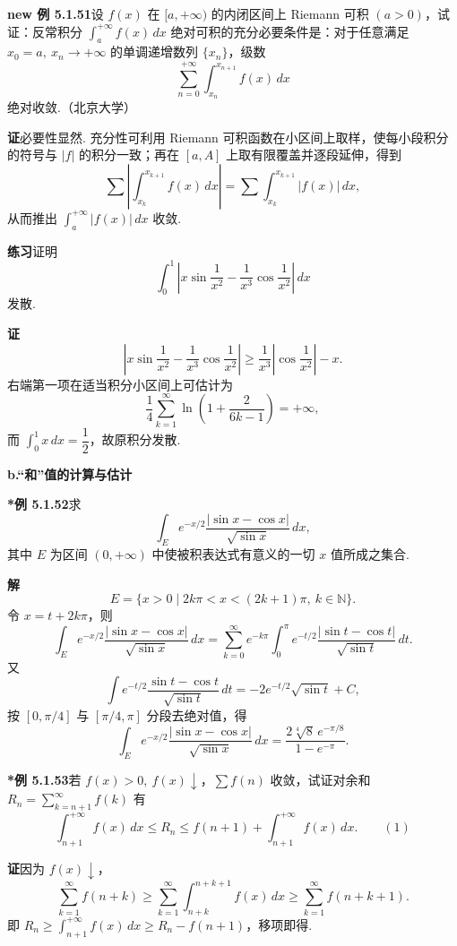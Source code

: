 \documentclass[UTF8, 12pt, fontset=fandol, oneside]{ctexart}
\begin{document}
\noindent\textbf{new 例 5.1.51}\quad 设 $f(x)$ 在 $[a,+\infty)$ 的内闭区间上 Riemann 可积 $(a>0)$，试证：反常积分 $\displaystyle\int_a^{+\infty}f(x)\,dx$ 绝对可积的充分必要条件是：对于任意满足 $x_0=a,\ x_n\to+\infty$ 的单调递增数列 $\{x_n\}$，级数
\[
  \sum_{n=0}^{+\infty}\int_{x_n}^{x_{n+1}}f(x)\,dx
\]
绝对收敛.（北京大学）

\noindent\textbf{证}\quad 必要性显然. 充分性可利用 Riemann 可积函数在小区间上取样，使每小段积分的符号与 $|f|$ 的积分一致；再在 $[a,A]$ 上取有限覆盖并逐段延伸，得到
\[
  \sum\left|\int_{x_k}^{x_{k+1}}f(x)\,dx\right|
  =\sum\int_{x_k}^{x_{k+1}}|f(x)|\,dx,
\]
从而推出 $\displaystyle\int_a^{+\infty}|f(x)|\,dx$ 收敛.

\noindent\textbf{练习}\quad 证明
\[
  \int_0^1\left|x\sin\frac1{x^2}-\frac1{x^3}\cos\frac1{x^2}\right|\,dx
\]
发散.

\noindent\textbf{证}\quad
\[
  \left|x\sin\frac1{x^2}-\frac1{x^3}\cos\frac1{x^2}\right|
  \ge\frac1{x^3}\left|\cos\frac1{x^2}\right|-x.
\]
右端第一项在适当积分小区间上可估计为
\[
  \frac14\sum_{k=1}^{\infty}\ln\left(1+\frac2{6k-1}\right)=+\infty,
\]
而 $\int_0^1x\,dx=\dfrac12$，故原积分发散.

\noindent\textbf{b.\quad “和”值的计算与估计}

\noindent\textbf{*例 5.1.52}\quad 求
\[
  \int_E e^{-x/2}\frac{|\sin x-\cos x|}{\sqrt{\sin x}}\,dx,
\]
其中 $E$ 为区间 $(0,+\infty)$ 中使被积表达式有意义的一切 $x$ 值所成之集合.

\noindent\textbf{解}\quad
\[
  E=\{x>0\mid 2k\pi<x<(2k+1)\pi,\ k\in\mathbb N\}.
\]
令 $x=t+2k\pi$，则
\[
  \int_E e^{-x/2}\frac{|\sin x-\cos x|}{\sqrt{\sin x}}\,dx
  =\sum_{k=0}^{\infty}e^{-k\pi}\int_0^\pi
  e^{-t/2}\frac{|\sin t-\cos t|}{\sqrt{\sin t}}\,dt.
\]
又
\[
  \int e^{-t/2}\frac{\sin t-\cos t}{\sqrt{\sin t}}\,dt
  =-2e^{-t/2}\sqrt{\sin t}+C,
\]
按 $[0,\pi/4]$ 与 $[\pi/4,\pi]$ 分段去绝对值，得
\[
  \int_E e^{-x/2}\frac{|\sin x-\cos x|}{\sqrt{\sin x}}\,dx
  =\frac{2\sqrt[4]8\,e^{-\pi/8}}{1-e^{-\pi}}.
\]

\noindent\textbf{*例 5.1.53}\quad 若 $f(x)>0,\ f(x)\downarrow$，$\displaystyle\sum f(n)$ 收敛，试证对余和 $R_n=\displaystyle\sum_{k=n+1}^{\infty}f(k)$ 有
\[
  \int_{n+1}^{+\infty}f(x)\,dx\le R_n\le f(n+1)+\int_{n+1}^{+\infty}f(x)\,dx.
\qquad(1)
\]

\noindent\textbf{证}\quad 因为 $f(x)\downarrow$，
\[
  \sum_{k=1}^{\infty}f(n+k)
  \ge\sum_{k=1}^{\infty}\int_{n+k}^{n+k+1}f(x)\,dx
  \ge\sum_{k=1}^{\infty}f(n+k+1).
\]
即 $R_n\ge\int_{n+1}^{+\infty}f(x)\,dx\ge R_n-f(n+1)$，移项即得.
\end{document}
